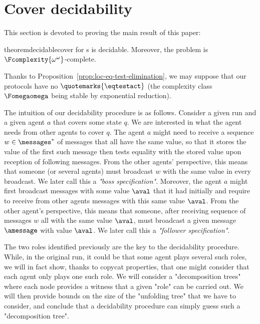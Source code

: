\section{Cover decidability}
\label{sec:cover-decidability}

This section is devoted to proving the main result of this paper:

\begin{restatable}{theorem}{decidablecover}
\COVER for \BNRA{}s is decidable. Moreover, the problem is $\Fcomplexity{\omega^\omega}$-complete.
\end{restatable}

Thanks to Proposition~\ref{prop:loc-eq-test-elimination}, we may suppose that our protocols have no $\quotemarks{\eqtestact}$ (the complexity class $\Fomegaomega$ being stable by exponential reduction). 

The intuition of our decidability procedure is as follows. 
Consider a given run and a given agent $a$ that covers some state $q$. We are interested in what the agent needs from other agents to cover $q$. The agent $a$ might need to receive a sequence $w \in \messages^*$ of messages that all have the same value, so that it stores the value of the first such message then tests equality with the stored value upon reception of following messages. 
From the other agents' perspective, this means that someone (or several agents) must broadcast $w$ with the same value in every broadcast. We later call this a \emph{"boss specification"}.  
Moreover, the agent $a$ might first broadcast messages with some value $\aval$ that it had initially and require to receive from other agents messages with this same value $\aval$. 
From the other agent's perspective, this means that someone, after receiving sequence of messages $w$ all with the same value $\aval$, must broadcast a given message $\amessage$ with value $\aval$. We later call this a \emph{"follower specification"}.

The two roles identified previously are the key to the decidability procedure. While, in the original run, it could be that some agent plays several such roles, we will in fact show, thanks to copycat properties, that one might consider that each agent only plays one such role. We will consider a "decomposition trees" where each node provides a witness that a given "role" can be carried out. We will then provide bounds on the size of the "unfolding tree" that we have to consider, and conclude that a decidability procedure can simply guess such a "decomposition tree". 

